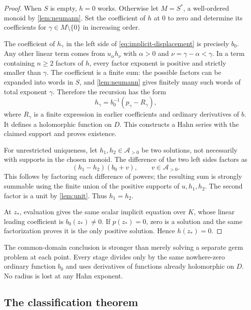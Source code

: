 \documentclass[11pt,a4paper]{article}
\numberwithin{equation}{section}
\theoremstyle{definition}
\theoremstyle{remark}
\newcommand{\A}{\mathcal A}
\begin{document}
\begin{proof}
When $S$ is empty, $h=0$ works.  Otherwise let
$M=S^*$, a well-ordered monoid by \cref{lem:neumann}.  Set the coefficient
of $h$ at $0$ to zero and determine its coefficients for
$\gamma\in M\setminus\{0\}$ in increasing order.

The coefficient of $h_\gamma$ in the left side of
\eqref{eq:implicit-displacement} is precisely $b_0$.  Any other linear
term comes from $u_\alpha h_\nu$ with $\alpha>0$ and
$\nu=\gamma-\alpha<\gamma$.  In a term containing $n\geq2$ factors
of $h$, every factor exponent is positive and strictly smaller than
$\gamma$.  The coefficient is a finite sum: the possible factors can be
expanded into words in $S$, and \cref{lem:neumann} gives finitely many
such words of total exponent $\gamma$.  Therefore the recursion has the
form
\[
 h_\gamma=b_0^{-1}(p_\gamma-R_\gamma),
\]
where $R_\gamma$ is a finite expression in earlier coefficients and
ordinary derivatives of $b$.  It defines a holomorphic function on $D$.
This constructs a Hahn series with the claimed support and proves existence.

For unrestricted uniqueness, let $h_1,h_2\in\A_{>0}$ be two solutions,
not necessarily with supports in the chosen monoid.  The difference of the
two left sides factors as
\[
 (h_1-h_2)(b_0+v),\qquad v\in\A_{>0}.
\]
This follows by factoring each difference of powers; the resulting sum is
strongly summable using the finite union of the positive supports of
$u,h_1,h_2$.  The second factor is a unit by \cref{lem:unit}.  Thus
$h_1=h_2$.

At $z_*$, evaluation gives the same scalar implicit equation over $K$,
whose linear leading coefficient is $b_0(z_*)\ne0$.  If $p(z_*)=0$,
zero is a solution and the same factorization proves it is the only
positive solution.  Hence $h(z_*)=0$.
\end{proof}

The common-domain conclusion is stronger than merely solving a separate
germ problem at each point.  Every stage divides only by the same
nowhere-zero ordinary function $b_0$ and uses derivatives of functions
already holomorphic on $D$.  No radius is lost at any Hahn exponent.

\subsection{The classification theorem}
\end{document}
